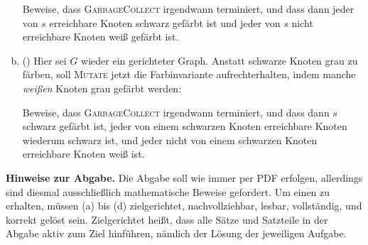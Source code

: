 \documentclass{uebung_cs}
\newcommand{\fett}[1]{\textbf{\boldmath\color{red!60!black}#1}}
\begin{document}
\begin{enumerate}[(a)]
        Beweise, dass \textsc{GarbageCollect} irgendwann terminiert, und dass dann jeder von $s$ erreichbare Knoten schwarz gefärbt ist und jeder von $s$ nicht erreichbare Knoten weiß gefärbt ist.
    \item (\veryhard) Hier sei $G$ wieder ein gerichteter Graph. Anstatt schwarze Knoten grau zu färben, soll \textsc{Mutate} jetzt die Farbinvariante aufrechterhalten, indem manche \emph{weißen} Knoten grau gefärbt werden:
    \begin{algorithmic}
            \STATE{\fett{färbe $w$ grau}}
            \ENDIF
            \STATE{\fett{färbe $u$ grau}}
            \ENDIF
        \ENDIF{}
    \end{algorithmic}
    Beweise, dass \textsc{GarbageCollect} irgendwann terminiert, und dass dann $s$ schwarz gefärbt ist, jeder von einem schwarzen Knoten erreichbare Knoten wiederum schwarz ist, und jeder nicht von einem schwarzen Knoten erreichbare Knoten weiß ist.
\end{enumerate}

\textbf{Hinweise zur Abgabe.}
Die Abgabe soll wie immer per PDF erfolgen, allerdings sind diesmal ausschließlich mathematische Beweise gefordert. Um einen  zu erhalten, müssen (a) bis (d) zielgerichtet, nachvollziehbar, lesbar, vollständig, und korrekt gelöst sein.
Zielgerichtet heißt, dass alle Sätze und Satzteile in der Abgabe aktiv zum Ziel hinführen, nämlich der Lösung der jeweiligen Aufgabe.
\end{document}
